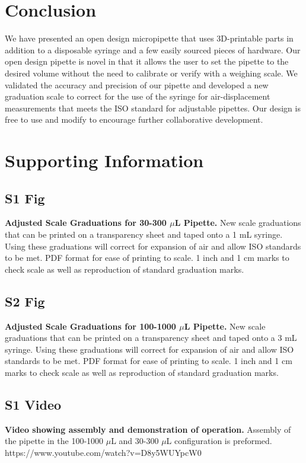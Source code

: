 \documentclass[10pt,letterpaper]{article}
\begin{document}
\section*{Conclusion}
We have presented an open design micropipette that uses 3D-printable parts in addition to a disposable syringe and a few easily sourced pieces of hardware.
Our open design pipette is novel in that it allows the user to set the pipette to the desired volume without the need to calibrate or verify with a weighing scale. 
We validated the accuracy and precision of our pipette and developed a new graduation scale to correct for the use of the syringe for air-displacement measurements that meets the ISO standard for adjustable pipettes.
Our design is free to use and modify to encourage further collaborative development.

\section*{Supporting Information}

\subsection*{S1 Fig}
\label{S1_Fig}
{\bf Adjusted Scale Graduations for 30-300 $\mu$L Pipette.} New scale graduations that can be printed on a transparency sheet and taped onto a 1 mL syringe. Using these graduations will correct for expansion of air and allow ISO standards to be met. PDF format for ease of printing to scale. 1 inch and 1 cm marks to check scale as well as reproduction of standard graduation marks.

\subsection*{S2 Fig}
\label{S2_Fig}
{\bf Adjusted Scale Graduations for 100-1000 $\mu$L Pipette.} New scale graduations that can be printed on a transparency sheet and taped onto a 3 mL syringe. Using these graduations will correct for expansion of air and allow ISO standards to be met. PDF format for ease of printing to scale. 1 inch and 1 cm marks to check scale as well as reproduction of standard graduation marks.

\subsection*{S1 Video}
\label{S1_Video}
{\bf Video showing assembly and demonstration of operation.} Assembly of the pipette in the 100-1000 $\mu$L and 30-300 $\mu$L configuration is preformed. https://www.youtube.com/watch?v=D8y5WUYpcW0

\nolinenumbers



\end{document}
